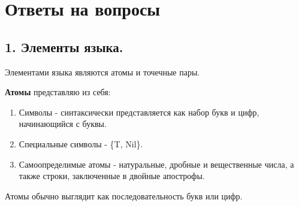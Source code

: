 \section*{Ответы на вопросы}
\setcounter{page}{2}









\subsection*{1. Элементы языка.}

Элементами языка являются атомы и точечные пары.

\textbf{Атомы} представляю из себя:
\begin{enumerate}
	\item Символы - синтаксически представляется как набор букв и цифр, начинающийся с буквы.
	\item Специальные символы - \{T, Nil\}.
	\item Самоопределимые атомы - натуральные, дробные и вещественные числа, а также строки, заключенные в двойные апострофы. 
\end{enumerate}

Атомы обычно выглядит как последовательность букв или цифр.

